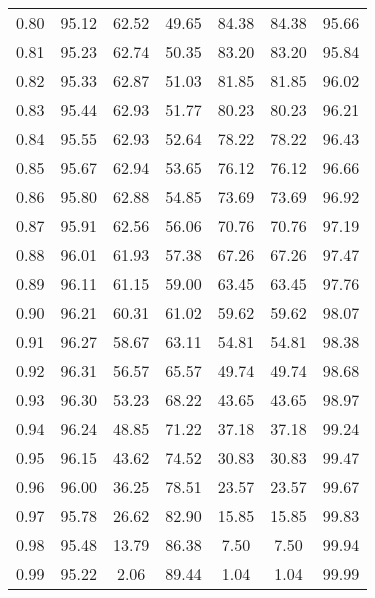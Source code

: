 \begin{tabular}{|c|c|c|c|c|c|c|}
      0.80 &     95.12 &     62.52 &      49.65 &   84.38 &      84.38 &         95.66 \\
      0.81 &     95.23 &     62.74 &      50.35 &   83.20 &      83.20 &         95.84 \\
      0.82 &     95.33 &     62.87 &      51.03 &   81.85 &      81.85 &         96.02 \\
      0.83 &     95.44 &     62.93 &      51.77 &   80.23 &      80.23 &         96.21 \\
      0.84 &     95.55 &     62.93 &      52.64 &   78.22 &      78.22 &         96.43 \\
      0.85 &     95.67 &     62.94 &      53.65 &   76.12 &      76.12 &         96.66 \\
      0.86 &     95.80 &     62.88 &      54.85 &   73.69 &      73.69 &         96.92 \\
      0.87 &     95.91 &     62.56 &      56.06 &   70.76 &      70.76 &         97.19 \\
      0.88 &     96.01 &     61.93 &      57.38 &   67.26 &      67.26 &         97.47 \\
      0.89 &     96.11 &     61.15 &      59.00 &   63.45 &      63.45 &         97.76 \\
      0.90 &     96.21 &     60.31 &      61.02 &   59.62 &      59.62 &         98.07 \\
      0.91 &     96.27 &     58.67 &      63.11 &   54.81 &      54.81 &         98.38 \\
      0.92 &     96.31 &     56.57 &      65.57 &   49.74 &      49.74 &         98.68 \\
      0.93 &     96.30 &     53.23 &      68.22 &   43.65 &      43.65 &         98.97 \\
      0.94 &     96.24 &     48.85 &      71.22 &   37.18 &      37.18 &         99.24 \\
      0.95 &     96.15 &     43.62 &      74.52 &   30.83 &      30.83 &         99.47 \\
      0.96 &     96.00 &     36.25 &      78.51 &   23.57 &      23.57 &         99.67 \\
      0.97 &     95.78 &     26.62 &      82.90 &   15.85 &      15.85 &         99.83 \\
      0.98 &     95.48 &     13.79 &      86.38 &    7.50 &       7.50 &         99.94 \\
      0.99 &     95.22 &      2.06 &      89.44 &    1.04 &       1.04 &         99.99 \\
\bottomrule
\end{tabular}
